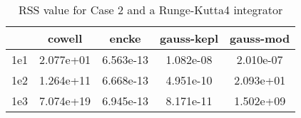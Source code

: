 \begin{table}
\centering
\begin{tabular}{|c|c|c|c|c|}
\hline
 & cowell & encke & gauss-kepl & gauss-mod \\
\hline
1e1 & 2.077e+01 & 6.563e-13 & 1.082e-08 & 2.010e-07 \\
\hline
1e2 & 1.264e+11 & 6.668e-13 & 4.951e-10 & 2.093e+01 \\
\hline
1e3 & 7.074e+19 & 6.945e-13 & 8.171e-11 & 1.502e+09 \\
\hline
\end{tabular}
\caption{RSS value for Case 2 and a Runge-Kutta4 integrator}
\label{table:tab:keplerapprox_rss_C2_Runge-Kutta4}
\end{table}
